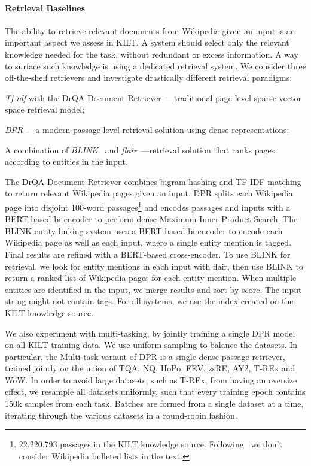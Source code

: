 \documentclass[11pt]{article}
\begin{document}
\paragraph{Retrieval Baselines}
The ability to retrieve relevant documents from Wikipedia given an input is an important aspect we assess in KILT. A system should select only the relevant knowledge needed for the task, without redundant or excess information.
A way to surface such knowledge is using a dedicated retrieval system.
We consider three off-the-shelf retrievers and investigate drastically different retrieval paradigms:
\begin{enumerate*}[label=(\roman*)] 
\item \emph{Tf-idf} with the DrQA Document Retriever~\cite{chen2017reading}---traditional page-level sparse vector space retrieval model;
\item \emph{DPR}~\cite{karpukhin2020dense}---a modern passage-level retrieval solution using dense representations;
\item A combination of \emph{BLINK}~\cite{wu2019zero} and \emph{flair}~\cite{akbik2019flair}---retrieval solution that ranks pages according to  entities in the input.
\end{enumerate*}


The DrQA Document Retriever combines bigram hashing and TF-IDF matching to return relevant Wikipedia pages given an input.
DPR splits each Wikipedia page into disjoint 100-word passages\footnote{22,220,793 passages in the KILT knowledge source. Following~\citet{karpukhin2020dense} we don't consider Wikipedia bulleted lists in the text.} and encodes passages and inputs with a BERT-based bi-encoder to perform dense Maximum Inner Product Search. 
The BLINK entity linking system uses a BERT-based bi-encoder to encode each Wikipedia page as well as each input, where a single entity mention is tagged. Final results are refined with a BERT-based cross-encoder. To use BLINK for retrieval, we look for entity mentions in each input with flair, then use BLINK to return a ranked list of Wikipedia pages for each entity mention. When multiple entities are identified in the input, we merge results and sort by score. The input string might not contain tags.
For all systems, we use the index created on the KILT knowledge source.


We also experiment with multi-tasking, by jointly training a single DPR model on all KILT training data. We use uniform sampling to balance the datasets.
In particular, the Multi-task variant of DPR is a single dense passage retriever, trained jointly on the union of TQA, NQ, HoPo, FEV, zsRE, AY2, T-REx and WoW. In order to avoid large datasets, such as T-REx, from having an oversize effect, we resample all datasets uniformly, such that every training epoch contains 150k samples from each task. Batches are formed from a single dataset at a time, iterating through the various datasets in a round-robin fashion.
\end{document}
